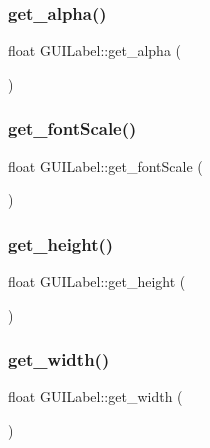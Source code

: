 \subsubsection{\texorpdfstring{get\+\_\+alpha()}{get\_alpha()}}
{\footnotesize\ttfamily float G\+U\+I\+Label\+::get\+\_\+alpha (\begin{DoxyParamCaption}{ }\end{DoxyParamCaption})}

\hypertarget{class_g_u_i_label_a3e9671282b142d0421f7887ea2c4924c}{}\label{class_g_u_i_label_a3e9671282b142d0421f7887ea2c4924c} 
\subsubsection{\texorpdfstring{get\+\_\+font\+Scale()}{get\_fontScale()}}
{\footnotesize\ttfamily float G\+U\+I\+Label\+::get\+\_\+font\+Scale (\begin{DoxyParamCaption}{ }\end{DoxyParamCaption})}

\hypertarget{class_g_u_i_label_ac21bf1bcf1c89b92ea6369a6b1bbfe28}{}\label{class_g_u_i_label_ac21bf1bcf1c89b92ea6369a6b1bbfe28} 
\subsubsection{\texorpdfstring{get\+\_\+height()}{get\_height()}}
{\footnotesize\ttfamily float G\+U\+I\+Label\+::get\+\_\+height (\begin{DoxyParamCaption}{ }\end{DoxyParamCaption})}

\hypertarget{class_g_u_i_label_a19fc8eec7e832bf7b4371e61696c7a79}{}\label{class_g_u_i_label_a19fc8eec7e832bf7b4371e61696c7a79} 
\subsubsection{\texorpdfstring{get\+\_\+width()}{get\_width()}}
{\footnotesize\ttfamily float G\+U\+I\+Label\+::get\+\_\+width (\begin{DoxyParamCaption}{ }\end{DoxyParamCaption})}

